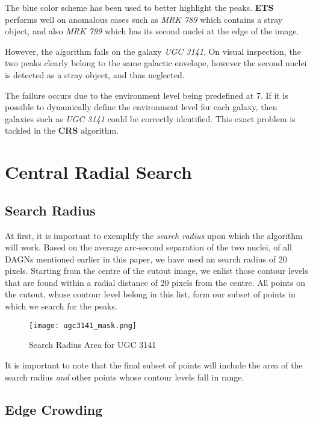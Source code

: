 \documentclass[12pt]{article}
\begin{document}
The blue color scheme has been used to better highlight the peaks. \textbf{ETS} performs well on anomalous cases such as \textit{MRK 789} which contains a stray object, and also \textit{MRK 799} which has its second nuclei at the edge of the image.

\bigskip

However, the algorithm fails on the galaxy \textit{UGC 3141}. On visual inspection, the two peaks clearly belong to the same galactic envelope, however the second nuclei is detected as a stray object, and thus neglected.

\bigskip

The failure occurs due to the environment level being predefined at 7. If it is possible to dynamically define the environment level for each galaxy, then galaxies such as \textit{UGC 3141} could be correctly identified. This exact problem is tackled in the \textbf{CRS} algorithm. 

\section {Central Radial Search}

\subsection {Search Radius}

At first, it is important to exemplify the \textit{search radius} upon which the algorithm will work. Based on the average arc-second separation of the two nuclei, of all DAGNs mentioned earlier in this paper, we have used an search radius of 20 pixels. Starting from the centre of the cutout image, we enlist those contour levels that are found within a radial distance of 20 pixels from the centre. All points on the cutout, whose contour level belong in this list, form our subset of points in which we search for the peaks.

\begin{figure}[t!]
    \centering
    \texttt{[image: ugc3141\_mask.png]}
    \caption{Search Radius Area for UGC 3141}
    \label{fig:ets_peaks}
\end{figure}

\bigskip

It is important to note that the final subset of points will include the area of the search radius \textit{and} other points whose contour levels fall in range.

\subsection {Edge Crowding}
\end{document}
